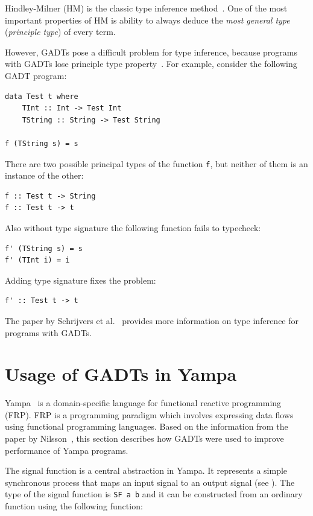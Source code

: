 \documentclass{tmr}
\newcommand{\italic}[1]{\textit{#1}}
\begin{document}
Hindley-Milner (HM) is the classic type inference method~\cite{cardelli_typechecking}. One of the most important properties of HM is ability to always deduce the \italic{most general type} (\italic{principle type}) of every term.

However, GADTs pose a difficult problem for type inference, because programs with GADTs lose principle type property~\cite{type_inference_gadts}. For example, consider the following GADT program:

\begin{Verbatim}
data Test t where
    TInt :: Int -> Test Int
    TString :: String -> Test String

f (TString s) = s
\end{Verbatim}

There are two possible principal types of the function \verb|f|, but neither of them is an instance of the other:

\begin{Verbatim}
f :: Test t -> String
f :: Test t -> t
\end{Verbatim}

Also without type signature the following function fails to typecheck:

\begin{Verbatim}
f' (TString s) = s
f' (TInt i) = i
\end{Verbatim}

Adding type signature fixes the problem:

\begin{Verbatim}
f' :: Test t -> t
\end{Verbatim}

The paper by Schrijvers et al.~\cite{type_inference_gadts} provides more information on type inference for programs with GADTs.

\section{Usage of GADTs in Yampa}
\label{sec:yampa}

Yampa~\cite{yampa} is a domain-specific language for functional reactive programming (FRP). FRP is a programming paradigm which involves expressing data flows using functional programming languages. Based on the information from the paper by Nilsson~\cite{yampa_gadts}, this section describes how GADTs were used to improve performance of Yampa programs.

The signal function is a central abstraction in Yampa. It represents a simple synchronous process that maps an input signal to an output signal (see ). The type of the signal function is \verb|SF a b| and it can be constructed from an ordinary function using the following function:
\end{document}
